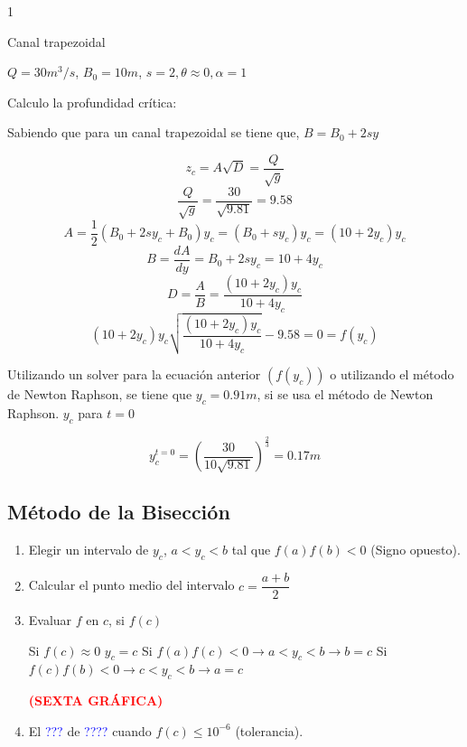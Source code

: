 \documentclass[11pt, oneside]{article}
\begin{document}
\begin{eje}{}{1}

Canal trapezoidal

$Q=30m^{3}/s$, $B_{0}=10m$, $s=2, \theta \approx0, \alpha=1$

Calculo la profundidad crítica:

    Sabiendo que para un canal trapezoidal se tiene que, $B=B_{0}+2sy$

    $$z_{c}=A\sqrt{D}=\dfrac{Q}{\sqrt{g}}$$
    $$\dfrac{Q}{\sqrt{g}}=\dfrac{30}{\sqrt{9.81}}=9.58$$
    $$A=\dfrac{1}{2}(B_{0}+2sy_{c}+B_{0})y_{c}=(B_{0}+sy_{c})y_{c}=(10+2y_{c})y_{c}$$
    $$B=\dfrac{dA}{dy}=B_{0}+2sy_{c}=10+4y_{c}$$
    $$D=\dfrac{A}{B}=\dfrac{(10+2y_{c})y_{c}}{10+4y_{c}}$$
    $$(10+2y_{c})y_{c}\sqrt{\dfrac{(10+2y_{c})y_{c}}{10+4y_{c}}}-9.58=0=f(y_c)$$

    Utilizando un solver para la ecuación anterior $(f(y_c))$ o utilizando el método de Newton Raphson, se tiene que $y_c=0.91m$, si se usa el método de Newton Raphson. $y_c$ para $t=0$

    $$y^{t=0}_{c}=\left(\dfrac{30}{10\sqrt{9.81}}\right)^\frac{2}{3}=0.17m$$
    
    
\end{eje}

\subsection{Método de la Bisección}

    \begin{enumerate}
        \item Elegir un intervalo de $y_{c}$, $a<y_{c}<b$ tal que $f(a)f(b)<0$ (Signo opuesto).
        \item Calcular el punto medio del intervalo $c=\dfrac{a+b}{2}$
        \item Evaluar $f$ en $c$, si $f(c)$

        Si $f(c)\approx0$ $y_c=c$
        Si $f(a)f(c)<0\rightarrow a<y_c<b \rightarrow b=c$
        Si $f(c)f(b)<0\rightarrow c<y_c<b \rightarrow a=c$

        \textcolor{red}{\textbf{(SEXTA GRÁFICA)}} \vspace{1ex}

        \item El \textcolor{blue}{???} de \textcolor{blue}{????} cuando $f(c)\leq 10^{-6}$ (tolerancia).
    \end{enumerate}
\end{document}
